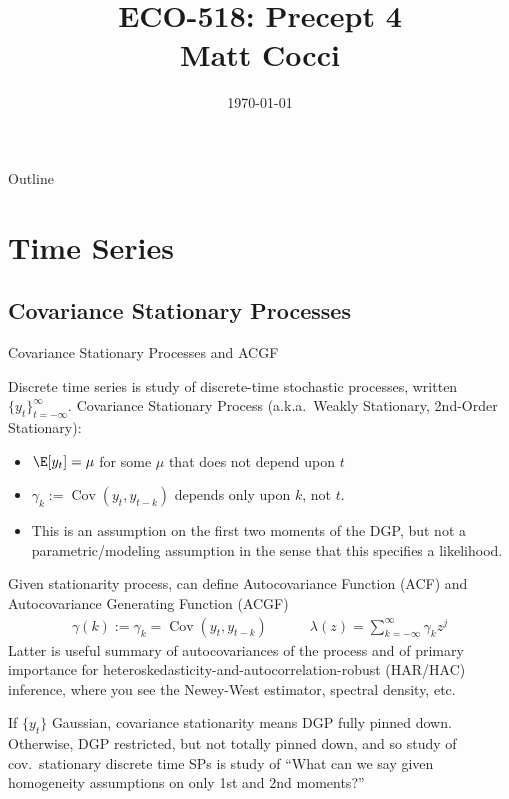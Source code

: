 \documentclass[aspectratio=169, handout]{beamer}
\title[]{ECO-518: Precept 4 \\ Matt Cocci}
\author[]{}
\date{\today}
\newcommand{\Cov}{\operatorname{Cov}}
\begin{document}
\begin{frame}[plain]
\titlepage
\end{frame}


\begin{frame}{Outline}
\tableofcontents[hideallsubsections]
\end{frame}



\section{Time Series}

\subsection{Covariance Stationary Processes}


{\scriptsize
\begin{frame}{Covariance Stationary Processes and ACGF}

Discrete time series is study of discrete-time stochastic processes,
written $\{y_t\}_{t=-\infty}^\infty$.
\vspace{-2pt}
Covariance Stationary Process
(a.k.a.\ Weakly Stationary, 2nd-Order Stationary):
\begin{itemize}
  \item $\E[y_t]=\mu$ for some $\mu$ that does not depend upon $t$
  \item $\gamma_k:=\Cov(y_t,y_{t-k})$ depends only upon $k$, not $t$.
  \item This is an assumption on the first two moments of the
    \alert{DGP}, but not a \alert{parametric}/\alert{modeling}
    assumption in the sense that this specifies a likelihood.
\end{itemize}
Given stationarity process, can define
\alert{Autocovariance Function} (ACF)
and \alert{Autocovariance Generating Function} (ACGF)
\begin{align*}
  \gamma(k)
  := \gamma_k
  = \Cov(y_t,y_{t-k})
  \qquad\quad
  \lambda(z)
  =
  \sum_{k=-\infty}^\infty \gamma_k z^j
\end{align*}
Latter is useful summary of autocovariances of the process and
of primary importance for heteroskedasticity-and-autocorrelation-robust
(HAR/HAC) inference, where you see the Newey-West estimator, spectral
density, etc.

\vspace{-5pt}
If $\{y_t\}$ \alert{Gaussian}, covariance stationarity means DGP
fully pinned down.
Otherwise, DGP restricted, but not totally pinned down, and so study of
cov.\ stationary discrete time SPs is study of
``What can we say given homogeneity assumptions on only 1st and 2nd
moments?''
\end{frame}
}
\end{document}
